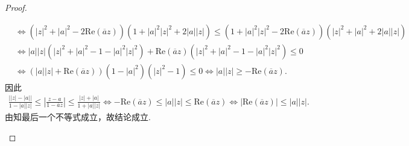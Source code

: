 \documentclass[../../main.tex]{subfiles}%
\begin{document}
\begin{proof}
\begin{enumerate}[(1)]
\begin{align*}
&\Longleftrightarrow \left( \left| z \right|^2+\left| a \right|^2-2\mathrm{Re}\left( \overline{a}z \right) \right) \left( 1+\left| a \right|^2\left| z \right|^2+2\left| a \right|\left| z \right| \right) \leqslant \left( 1+\left| a \right|^2\left| z \right|^2-2\mathrm{Re}\left( \overline{a}z \right) \right) \left( \left| z \right|^2+\left| a \right|^2+2\left| a \right|\left| z \right| \right) \\
&\Longleftrightarrow \left| a \right|\left| z \right|\left( \left| z \right|^2+\left| a \right|^2-1-\left| a \right|^2\left| z \right|^2 \right) +\mathrm{Re}\left( \overline{a}z \right) \left( \left| z \right|^2+\left| a \right|^2-1-\left| a \right|^2\left| z \right|^2 \right) \leqslant 0\\
&\Longleftrightarrow \left( \left| a \right|\left| z \right|+\mathrm{Re}\left( \overline{a}z \right) \right) \left( 1-\left| a \right|^2 \right) \left( \left| z \right|^2-1 \right) \leqslant 0\Longleftrightarrow \left| a \right|\left| z \right|\geqslant -\mathrm{Re}\left( \overline{a}z \right) .
\end{align*}
因此
\begin{align*}
\frac{\left| \left| z \right|-\left| a \right| \right|}{1-\left| a \right|\left| z \right|}\leqslant \left| \frac{z-a}{1-\overline{a}z} \right|\leqslant \frac{\left| z \right|+\left| a \right|}{1+\left| a \right|\left| z \right|}
\Longleftrightarrow -\mathrm{Re}\left( \overline{a}z \right) \leqslant \left| a \right|\left| z \right|\leqslant \mathrm{Re}\left( \overline{a}z \right) \Longleftrightarrow \left| \mathrm{Re}\left( \overline{a}z \right) \right|\leqslant \left| a \right|\left| z \right|.
\end{align*}
由知最后一个不等式成立，故结论成立.
\end{enumerate}

\end{proof}
\end{document}
